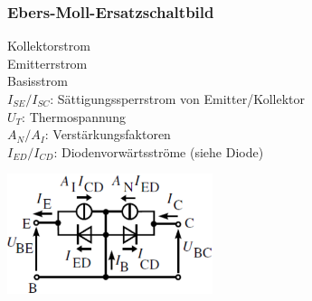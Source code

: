         \subsubsection{Ebers-Moll-Ersatzschaltbild}
            \begin{minipage}[T]{13cm}
                Kollektorstrom
                \hspace{18.7mm}\\
                Emitterrstrom
                \hspace{19.7mm}\\
                Basisstrom
                \hspace{25.1mm}\vspace{1mm}\\ 
                \hspace*{43mm}$I_{SE}/I_{SC}$: S\"attigungssperrstrom von Emitter/Kollektor\\
                \hspace*{43mm}$U_T$: Thermospannung\\
                \hspace*{43mm}$A_N / A_I$: Verst\"arkungsfaktoren\\
                \hspace*{43mm}$I_{ED}/I_{CD}$: Diodenvorw\"artsstr\"ome (siehe Diode)\\
            \end{minipage}
            \begin{minipage}[T]{6cm}
                \includegraphics[width=6cm]{./bilder/EberMollModell.png}
            \end{minipage}
            

